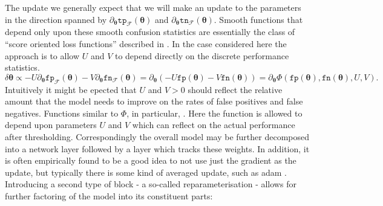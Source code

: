\documentclass[10pt,a4paper]{article}
\begin{document}
The update we generally expect that we will make an update to the parameters in the direction spanned by $\partial_{\boldsymbol\theta}\texttt{tp}_{\mathcal F}(\boldsymbol\theta)$ and $\partial_{\boldsymbol\theta}\texttt{tn}_{\mathcal F}(\boldsymbol\theta)$.
Smooth functions that depend only upon these smooth confusion statistics are essentially the class of ``score oriented loss functions'' described in \cite{marchetti2022score}.
In the case considered here the approach is to allow $U$ and $V$ to depend directly on the discrete performance statistics.
$$
\delta\boldsymbol\theta\propto-U\partial_{\boldsymbol\theta}\texttt{fp}_{\mathcal F}(\boldsymbol\theta)-V\partial_{\boldsymbol\theta}\texttt{fn}_{\mathcal F}(\boldsymbol\theta)=\partial_{\boldsymbol\theta}(-U\texttt{fp}(\boldsymbol\theta)-V\texttt{fn}(\boldsymbol\theta))=\partial_{\boldsymbol\theta}\Phi(\texttt{fp}(\boldsymbol\theta),\texttt{fn}(\boldsymbol\theta),U,V).
$$
Intuitively it might be epected that $U$ and $V>0$ should reflect the relative amount that the model needs to improve on the rates of false positives and false negatives.
Functions similar to $\Phi$, in particular, .
Here the function is allowed to depend upon parameters $U$ and $V$ which can reflect on the actual performance after thresholding.
Correspondingly the overall model may be further decomposed into a network layer followed by a layer which tracks these weights.
In addition, it is often empirically found to be a good idea to not use just the gradient as the update, but typically there is some kind of averaged update, such as adam \cite{kingma2017adammethodstochasticoptimization}.
Introducing a second type of block - a so-called reparameterisation - allows for further factoring of the model into its constituent parts:\\
\end{document}
